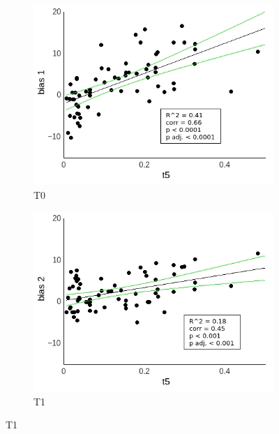 \documentclass[a4paper]{scrreprt}
\begin{document}
\begin{figure}
\centering
\begin{subfigure}[b]{0.49\textwidth}
        \includegraphics[width=\textwidth]{figs/sec3/t5/t5no_diff_1_mod1mod1.jpeg}
        \caption{T0}
    \end{subfigure}
    \begin{subfigure}[b]{0.49\textwidth}
        \includegraphics[width=\textwidth]{figs/sec3/t5/t5no_diff_2_mod1mod1.jpeg}
        \caption{T1}
    \end{subfigure}


\end{figure}
\end{document}
